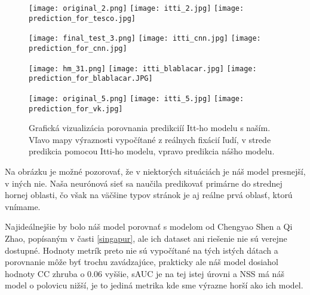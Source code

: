 	\begin{figure}[H]
		\begin{center}
			\texttt{[image: original\_2.png]}
			\texttt{[image: itti\_2.jpg]}
			\texttt{[image: prediction\_for\_tesco.jpg]}			
		\end{center}
		\begin{center}
			\texttt{[image: final\_test\_3.png]}
			\texttt{[image: itti\_cnn.jpg]}
			\texttt{[image: prediction\_for\_cnn.jpg]}			
		\end{center}
		\begin{center}
			\texttt{[image: hm\_31.png]}
			\texttt{[image: itti\_blablacar.jpg]}
			\texttt{[image: prediction\_for\_blablacar.JPG]}			
		\end{center}
		\begin{center}
			\texttt{[image: original\_5.png]}
			\texttt{[image: itti\_5.jpg]}
			\texttt{[image: prediction\_for\_vk.jpg]}			
		\end{center}
		\caption[Náš model vs. Itti-ho model]{
			Grafická vizualizácia porovnania predikciíí Itt-ho modelu s naším. Vľavo mapy výraznosti vypočítané z reálnych fixácií ľudí, v strede predikcia pomocou Itti-ho modelu, vpravo predikcia nášho modelu.
		}\label{fig:itti_vs_my}
	\end{figure}

Na obrázku je možné pozorovať, že v niektorých situáciách je náš model presnejší, v iných nie. Naša neurónová sieť sa naučila predikovať primárne do strednej hornej oblasti, čo však na väčšine typov stránok je aj reálne prvá oblasť, ktorú vnímame. 

Najideálnejšie by bolo náš model porovnať s modelom od Chengyao Shen a Qi Zhao\cite{singapur_model}, popísaným v časti \ref{singapur}, ale ich dataset ani riešenie nie sú verejne dostupné. Hodnoty metrík preto nie sú vypočítané na tých istých dátach a porovnanie môže byť trochu zavádzajúce, prakticky ale náš model dosiahol hodnoty CC zhruba o 0.06 vyššie, sAUC je na tej istej úrovni a NSS má náš model o polovicu nižší, je to jediná metrika kde sme výrazne horší ako ich model. 